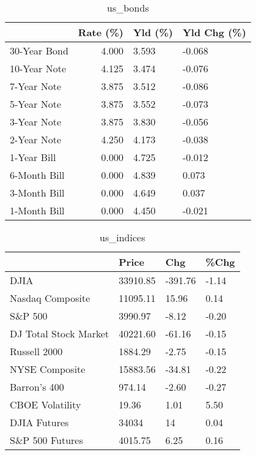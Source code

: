 \documentclass{article}%
\begin{document}
\begin{table}[htbp]%
\caption{us\_bonds}%
\centering%
\begin{adjustbox}{width=1\textwidth}%
\begin{tabular}{lrll}
\toprule
             &  Rate (\%) & Yld (\%) & Yld Chg (\%) \\
\midrule
30-Year Bond &     4.000 &   3.593 &      -0.068 \\
10-Year Note &     4.125 &   3.474 &      -0.076 \\
 7-Year Note &     3.875 &   3.512 &      -0.086 \\
 5-Year Note &     3.875 &   3.552 &      -0.073 \\
 3-Year Note &     3.875 &   3.830 &      -0.056 \\
 2-Year Note &     4.250 &   4.173 &      -0.038 \\
 1-Year Bill &     0.000 &   4.725 &      -0.012 \\
6-Month Bill &     0.000 &   4.839 &       0.073 \\
3-Month Bill &     0.000 &   4.649 &       0.037 \\
1-Month Bill &     0.000 &   4.450 &      -0.021 \\
\bottomrule
\end{tabular}
%
\end{adjustbox}%
\end{table}

%


\begin{table}[htbp]%
\caption{us\_indices}%
\centering%
\begin{adjustbox}{width=1\textwidth}%
\begin{tabular}{llll}
\toprule
                      &    Price &     Chg &  \%Chg \\
\midrule
                 DJIA & 33910.85 & -391.76 & -1.14 \\
     Nasdaq Composite & 11095.11 &   15.96 &  0.14 \\
              S\&P 500 &  3990.97 &   -8.12 & -0.20 \\
DJ Total Stock Market & 40221.60 &  -61.16 & -0.15 \\
         Russell 2000 &  1884.29 &   -2.75 & -0.15 \\
       NYSE Composite & 15883.56 &  -34.81 & -0.22 \\
         Barron's 400 &   974.14 &   -2.60 & -0.27 \\
      CBOE Volatility &    19.36 &    1.01 &  5.50 \\
         DJIA Futures &    34034 &      14 &  0.04 \\
      S\&P 500 Futures &  4015.75 &    6.25 &  0.16 \\
\bottomrule
\end{tabular}
%
\end{adjustbox}%
\end{table}
\end{document}
